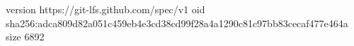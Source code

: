version https://git-lfs.github.com/spec/v1
oid sha256:adca809d82a051c459eb4e3cd38cd99f28a4a1290c81c97bb83cecaf477e464a
size 6892
